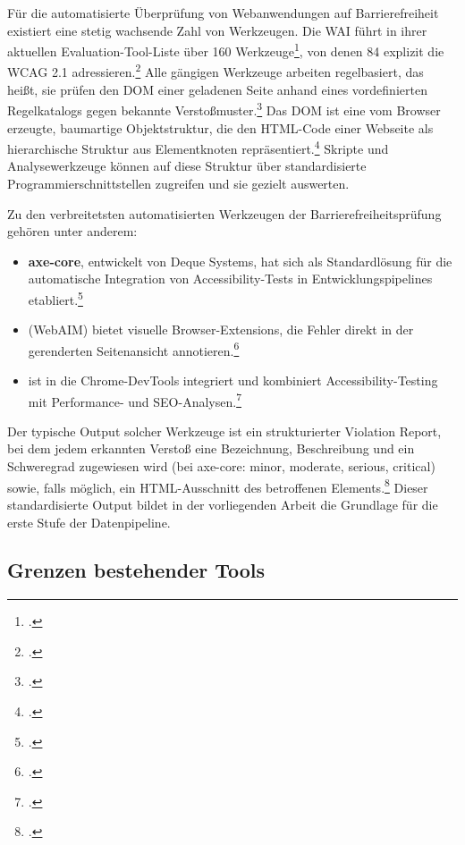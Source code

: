 Für die automatisierte Überprüfung von Webanwendungen auf Barrierefreiheit existiert eine stetig wachsende Zahl von Werkzeugen. Die \ac{WAI} führt in ihrer aktuellen Evaluation-Tool-Liste über 160 Werkzeuge\footcite[Vgl.][]{WAITools}, von denen 84 explizit die \ac{WCAG} 2.1 adressieren.\footcite[Vgl.][]{delnevo_interaction_2024}
Alle gängigen Werkzeuge arbeiten regelbasiert, das heißt, sie prüfen den \ac{DOM} einer geladenen Seite anhand eines vordefinierten Regelkatalogs gegen bekannte Verstoßmuster.\footcites[Vgl.][]{kodithuwakku_assessing_2025}[][3:9]{manca_transparency_2023}
Das \acf{DOM} ist eine vom Browser erzeugte, baumartige Objektstruktur, die den \acs{HTML}-Code einer Webseite als hierarchische Struktur aus Elementknoten repräsentiert.\footcite[Vgl.][S. 361--364]{Flanagan_2020} Skripte und Analysewerkzeuge können auf diese Struktur über standardisierte Programmierschnittstellen zugreifen und sie gezielt auswerten.

Zu den verbreitetsten automatisierten Werkzeugen der Barrierefreiheitsprüfung gehören unter anderem:
\begin{itemize}
    \item \textbf{axe-core}, entwickelt von Deque Systems, hat sich als Standardlösung für die automatische Integration von Accessibility-Tests in Entwicklungspipelines etabliert.\footcite[Vgl.][]{axe}
    \item {} (WebAIM) bietet visuelle Browser-Extensions, die Fehler direkt in der gerenderten Seitenansicht annotieren.\footcite[Vgl.][]{WAVE}
    \item {} ist in die Chrome-DevTools integriert und kombiniert Accessibility-Testing mit Performance- und \acs{SEO}-Analysen.\footcite[Vgl.][]{Lighthouse}
\end{itemize}

Der typische Output solcher Werkzeuge ist ein strukturierter Violation Report, bei dem jedem erkannten Verstoß eine Bezeichnung, Beschreibung und ein Schweregrad zugewiesen wird (bei axe-core: minor, moderate, serious, critical) sowie, falls möglich, ein \acs{HTML}-Ausschnitt des betroffenen Elements.\footcites[Vgl.][]{kodithuwakku_assessing_2025}[][]{axe} Dieser standardisierte Output bildet in der vorliegenden Arbeit die Grundlage für die erste Stufe der Datenpipeline.

\subsection{Grenzen bestehender Tools} \label{kap:grenzen Tools}

